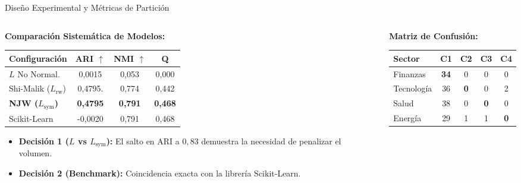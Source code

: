 \documentclass[aspectratio=169, 10pt]{beamer}
\begin{document}
\begin{frame}{Diseño Experimental y Métricas de Partición}
	\begin{columns}[T]
		\begin{column}{0.55\textwidth}
			\textbf{Comparación Sistemática de Modelos:}
			\vspace{0.2cm}
			
			\begin{table}[h]
				\centering
				\scriptsize
				\begin{tabular}{l c c c}
					\toprule
					\textbf{Configuración} & \textbf{ARI} \(\uparrow\) & \textbf{NMI} \(\uparrow\) & \textbf{Q} \\
					\midrule
					\(L\) No Normal. & 0,0015 & 0,053 & 0,000 \\
					Shi-Malik (\(L_{\text{rw}}\)) & 0,4795. & 0,774 & 0,442 \\
					\textbf{NJW (\(L_{\text{sym}}\))} & \textbf{0,4795} & \textbf{0,791} &  \textbf{0,468} \\
					Scikit-Learn  & -0,0020 & 0,791 & 0,468 \\
					\bottomrule
				\end{tabular}
			\end{table}
			
			\vspace{0.1cm}
			\begin{itemize}
				\item \textbf{Decisión 1 (\(L\) vs \(L_{\text{sym}}\)):} El salto en ARI a $0,83$ demuestra la necesidad de penalizar el volumen.
				\item \textbf{Decisión 2 (Benchmark):} Coincidencia exacta con la librería Scikit-Learn.
			\end{itemize}
		\end{column}
		
		\begin{column}{0.43\textwidth}
			\textbf{Matriz de Confusión:}
			\vspace{0.1cm}
			
			\begin{table}[h]
				\centering
				\tiny
				\begin{tabular}{l c c c c}
					\toprule
					\textbf{Sector} & \textbf{C1} & \textbf{C2} & \textbf{C3} & \textbf{C4} \\
					\midrule
					Finanzas   & \textbf{34} & 0  & 0  & 0  \\
					Tecnología & 36  & \textbf{0} & 0  & 2  \\
					Salud      & 38  & 0  & \textbf{0} & 0  \\
					Energía    & 29  & 1  & 1  & \textbf{0} \\
					\bottomrule
				\end{tabular}
			\end{table}
			

\end{column}
\end{columns}
\end{frame}
\end{document}
